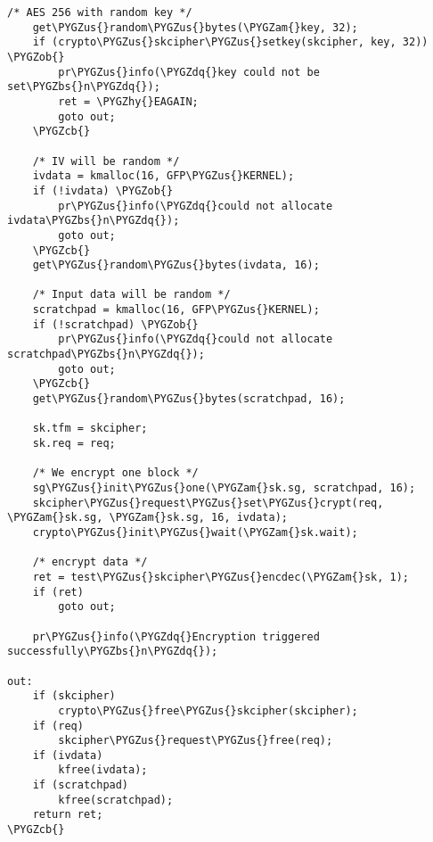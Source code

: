 \documentclass[a4paper,8pt,english]{sphinxmanual}
\def\PYGZbs{\char`\\}
\def\PYGZus{\char`\_}
\def\PYGZob{\char`\{}
\def\PYGZcb{\char`\}}
\def\PYGZam{\char`\&}
\def\PYGZhy{\char`\-}
\def\PYGZdq{\char`\"}
\begin{document}
\begin{Verbatim}[commandchars=\\\{\}]
    /* AES 256 with random key */
    get\PYGZus{}random\PYGZus{}bytes(\PYGZam{}key, 32);
    if (crypto\PYGZus{}skcipher\PYGZus{}setkey(skcipher, key, 32)) \PYGZob{}
        pr\PYGZus{}info(\PYGZdq{}key could not be set\PYGZbs{}n\PYGZdq{});
        ret = \PYGZhy{}EAGAIN;
        goto out;
    \PYGZcb{}

    /* IV will be random */
    ivdata = kmalloc(16, GFP\PYGZus{}KERNEL);
    if (!ivdata) \PYGZob{}
        pr\PYGZus{}info(\PYGZdq{}could not allocate ivdata\PYGZbs{}n\PYGZdq{});
        goto out;
    \PYGZcb{}
    get\PYGZus{}random\PYGZus{}bytes(ivdata, 16);

    /* Input data will be random */
    scratchpad = kmalloc(16, GFP\PYGZus{}KERNEL);
    if (!scratchpad) \PYGZob{}
        pr\PYGZus{}info(\PYGZdq{}could not allocate scratchpad\PYGZbs{}n\PYGZdq{});
        goto out;
    \PYGZcb{}
    get\PYGZus{}random\PYGZus{}bytes(scratchpad, 16);

    sk.tfm = skcipher;
    sk.req = req;

    /* We encrypt one block */
    sg\PYGZus{}init\PYGZus{}one(\PYGZam{}sk.sg, scratchpad, 16);
    skcipher\PYGZus{}request\PYGZus{}set\PYGZus{}crypt(req, \PYGZam{}sk.sg, \PYGZam{}sk.sg, 16, ivdata);
    crypto\PYGZus{}init\PYGZus{}wait(\PYGZam{}sk.wait);

    /* encrypt data */
    ret = test\PYGZus{}skcipher\PYGZus{}encdec(\PYGZam{}sk, 1);
    if (ret)
        goto out;

    pr\PYGZus{}info(\PYGZdq{}Encryption triggered successfully\PYGZbs{}n\PYGZdq{});

out:
    if (skcipher)
        crypto\PYGZus{}free\PYGZus{}skcipher(skcipher);
    if (req)
        skcipher\PYGZus{}request\PYGZus{}free(req);
    if (ivdata)
        kfree(ivdata);
    if (scratchpad)
        kfree(scratchpad);
    return ret;
\PYGZcb{}
\end{Verbatim}
\end{document}

